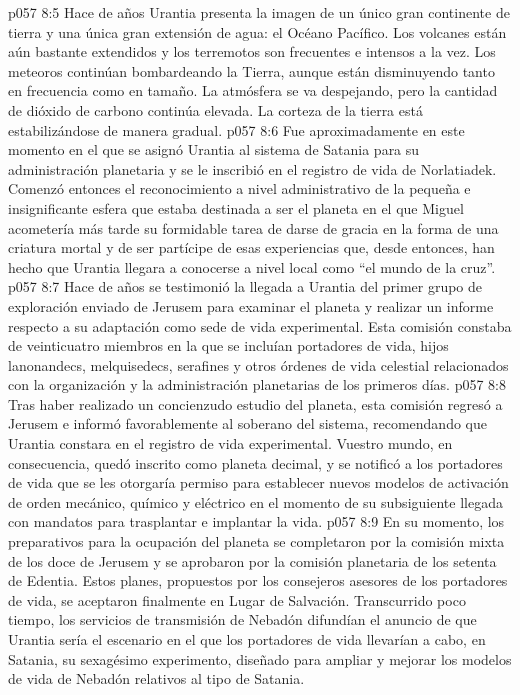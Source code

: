 \vs p057 8:5 \pc Hace  de años Urantia presenta la imagen de un único gran continente de tierra y una única gran extensión de agua: el Océano Pacífico. Los volcanes están aún bastante extendidos y los terremotos son frecuentes e intensos a la vez. Los meteoros continúan bombardeando la Tierra, aunque están disminuyendo tanto en frecuencia como en tamaño. La atmósfera se va despejando, pero la cantidad de dióxido de carbono continúa elevada. La corteza de la tierra está estabilizándose de manera gradual.
\vs p057 8:6 Fue aproximadamente en este momento en el que se asignó Urantia al sistema de Satania para su administración planetaria y se le inscribió en el registro de vida de Norlatiadek. Comenzó entonces el reconocimiento a nivel administrativo de la pequeña e insignificante esfera que estaba destinada a ser el planeta en el que Miguel acometería más tarde su formidable tarea de darse de gracia en la forma de una criatura mortal y de ser partícipe de esas experiencias que, desde entonces, han hecho que Urantia llegara a conocerse a nivel local como “el mundo de la cruz”.
\vs p057 8:7 \pc Hace  de años se testimonió la llegada a Urantia del primer grupo de exploración enviado de Jerusem para examinar el planeta y realizar un informe respecto a su adaptación como sede de vida experimental. Esta comisión constaba de veinticuatro miembros en la que se incluían portadores de vida, hijos lanonandecs, melquisedecs, serafines y otros órdenes de vida celestial relacionados con la organización y la administración planetarias de los primeros días.
\vs p057 8:8 Tras haber realizado un concienzudo estudio del planeta, esta comisión regresó a Jerusem e informó favorablemente al soberano del sistema, recomendando que Urantia constara en el registro de vida experimental. Vuestro mundo, en consecuencia, quedó inscrito como planeta decimal, y se notificó a los portadores de vida que se les otorgaría permiso para establecer nuevos modelos de activación de orden mecánico, químico y eléctrico en el momento de su subsiguiente llegada con mandatos para trasplantar e implantar la vida.
\vs p057 8:9 En su momento, los preparativos para la ocupación del planeta se completaron por la comisión mixta de los doce de Jerusem y se aprobaron por la comisión planetaria de los setenta de Edentia. Estos planes, propuestos por los consejeros asesores de los portadores de vida, se aceptaron finalmente en Lugar de Salvación. Transcurrido poco tiempo, los servicios de transmisión de Nebadón difundían el anuncio de que Urantia sería el escenario en el que los portadores de vida llevarían a cabo, en Satania, su sexagésimo experimento, diseñado para ampliar y mejorar los modelos de vida de Nebadón relativos al tipo de Satania.
